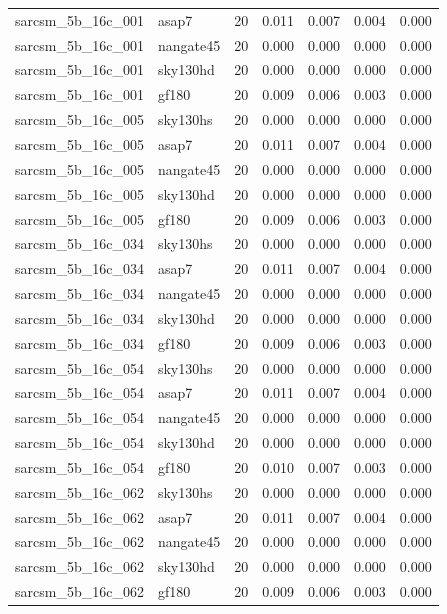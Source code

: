\begin{tabular}{llrrrrr}
sarcsm\_5b\_16c\_001 & asap7 & 20 & 0.011 & 0.007 & 0.004 & 0.000 \\
sarcsm\_5b\_16c\_001 & nangate45 & 20 & 0.000 & 0.000 & 0.000 & 0.000 \\
sarcsm\_5b\_16c\_001 & sky130hd & 20 & 0.000 & 0.000 & 0.000 & 0.000 \\
sarcsm\_5b\_16c\_001 & gf180 & 20 & 0.009 & 0.006 & 0.003 & 0.000 \\
sarcsm\_5b\_16c\_005 & sky130hs & 20 & 0.000 & 0.000 & 0.000 & 0.000 \\
sarcsm\_5b\_16c\_005 & asap7 & 20 & 0.011 & 0.007 & 0.004 & 0.000 \\
sarcsm\_5b\_16c\_005 & nangate45 & 20 & 0.000 & 0.000 & 0.000 & 0.000 \\
sarcsm\_5b\_16c\_005 & sky130hd & 20 & 0.000 & 0.000 & 0.000 & 0.000 \\
sarcsm\_5b\_16c\_005 & gf180 & 20 & 0.009 & 0.006 & 0.003 & 0.000 \\
sarcsm\_5b\_16c\_034 & sky130hs & 20 & 0.000 & 0.000 & 0.000 & 0.000 \\
sarcsm\_5b\_16c\_034 & asap7 & 20 & 0.011 & 0.007 & 0.004 & 0.000 \\
sarcsm\_5b\_16c\_034 & nangate45 & 20 & 0.000 & 0.000 & 0.000 & 0.000 \\
sarcsm\_5b\_16c\_034 & sky130hd & 20 & 0.000 & 0.000 & 0.000 & 0.000 \\
sarcsm\_5b\_16c\_034 & gf180 & 20 & 0.009 & 0.006 & 0.003 & 0.000 \\
sarcsm\_5b\_16c\_054 & sky130hs & 20 & 0.000 & 0.000 & 0.000 & 0.000 \\
sarcsm\_5b\_16c\_054 & asap7 & 20 & 0.011 & 0.007 & 0.004 & 0.000 \\
sarcsm\_5b\_16c\_054 & nangate45 & 20 & 0.000 & 0.000 & 0.000 & 0.000 \\
sarcsm\_5b\_16c\_054 & sky130hd & 20 & 0.000 & 0.000 & 0.000 & 0.000 \\
sarcsm\_5b\_16c\_054 & gf180 & 20 & 0.010 & 0.007 & 0.003 & 0.000 \\
sarcsm\_5b\_16c\_062 & sky130hs & 20 & 0.000 & 0.000 & 0.000 & 0.000 \\
sarcsm\_5b\_16c\_062 & asap7 & 20 & 0.011 & 0.007 & 0.004 & 0.000 \\
sarcsm\_5b\_16c\_062 & nangate45 & 20 & 0.000 & 0.000 & 0.000 & 0.000 \\
sarcsm\_5b\_16c\_062 & sky130hd & 20 & 0.000 & 0.000 & 0.000 & 0.000 \\
sarcsm\_5b\_16c\_062 & gf180 & 20 & 0.009 & 0.006 & 0.003 & 0.000 \\

\end{tabular}

